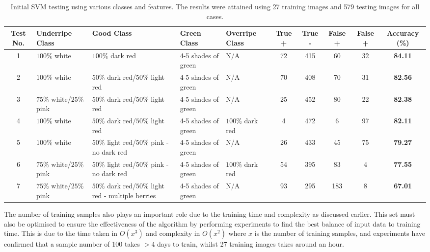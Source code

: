 \documentclass[fleqn,twoside]{article}
\begin{document}
\begin{table} 
	\caption{Initial SVM testing using various classes and features. The results were attained using 27 training images and 579 testing images for all cases.}
	\label{tab:svm_results}
	\begin{tabularx}{\textheight}{cXXXXccccc}
		\hline
		\textbf{Test No.} & 		\textbf{Underripe Class} & \textbf{Good Class} & \textbf{Green Class} & \textbf{Overripe Class} & \textbf{True +} & \textbf{True -} & \textbf{False +} & 		\textbf{False +} & 		\textbf{Accuracy (\%)} \tabularnewline
		\hline
		
		 1 & 
		 $100\%$ white & 
		 $100\%$ dark red &
		 4-5 shades of green & N/A & 72 & 415 & 60 & 32 &   \textbf{84.11}
		\tabularnewline
		\hline

		 2 & 
		 $100\%$ white & 
		 $50\%$ dark red/$50\%$ light red &
		 4-5 shades of green & N/A & 70 & 408 & 70 & 31 & \textbf{82.56}
		\tabularnewline
		\hline
				
		 3 & 
		 $75\%$ white/$25\%$ pink & 
		 $50\%$ dark red/$50\%$ light red &
		 4-5 shades of green &
		 N/A & 25 & 452 & 80 & 22 & \textbf{82.38}
		 \tabularnewline
		 \hline
		
		 4 & 
		 $100\%$ white & 
		 $50\%$ dark red/$50\%$ light red&
		 4-5 shades of green &
		 $100\%$ dark red & 4 & 472 & 6 & 97 & \textbf{82.11}
		\tabularnewline
		\hline

		 5 & 
		 $100\%$ white & 
		 $50\%$ light red/$50\%$ pink - no dark red &
		 4-5 shades of green & N/A & 26 & 433 & 45 & 75 & \textbf{79.27} 
		\tabularnewline
		\hline

		 6 & 
		 $75\%$ white/$25\%$ pink & 
		 $50\%$ light red/$50\%$ pink - no dark red &
		 4-5 shades of green & $100\%$ dark red & 54 & 395 & 83 & 4 & \textbf{77.55}
		\tabularnewline
		\hline

		 7 & 
		 $75\%$ white/$25\%$ pink & 
		 $50\%$ dark red/$50\%$ light red - multiple berries &
		 4-5 shades of green & N/A & 93 & 295 & 183 & 8 & \textbf{67.01}
		\tabularnewline
		\hline 
	\end{tabularx}
\end{table} 


The number of training samples also plays an important role due to the training time and complexity as discussed earlier. This set must also be optimised to ensure the effectiveness of the algorithm by performing experiments to find the best balance of input data to training time. This is due to the time taken in $O(x^3)$ and complexity in $O(x^2)$ where $x$ is the number of training samples, and experiments have confirmed that a sample number of 100 takes $>4$ days to train, whilst 27 training images takes around an hour.  
\end{document}
